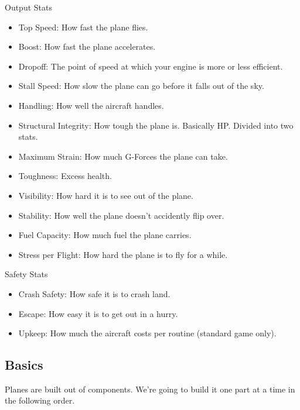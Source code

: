 \documentclass{article}
\begin{document}
Output Stats

\begin{itemize}
  \item          Top Speed: How fast the plane flies.
  \item          Boost: How fast the plane accelerates.
  \item          Dropoff: The point of speed at which your engine is more or
        less efficient.
  \item          Stall Speed: How slow the plane can go before it falls out of
        the sky.
  \item          Handling: How well the aircraft handles.
  \item          Structural Integrity: How tough the plane is. Basically HP.
        Divided into two stats.
  \item          Maximum Strain: How much G-Forces the plane can take.
  \item          Toughness: Excess health.
  \item          Visibility: How hard it is to see out of the plane.
  \item          Stability: How well the plane doesn't accidently flip over.
  \item          Fuel Capacity: How much fuel the plane carries.
  \item          Stress per Flight: How hard the plane is to fly for a while.
\end{itemize}

Safety Stats

\begin{itemize}
  \item          Crash Safety: How safe it is to crash land.
  \item          Escape: How easy it is to get out in a hurry.
  \item          Upkeep: How much the aircraft costs per routine (standard game
        only).
\end{itemize}

\subsection{Basics}
\label{_Basics}

Planes are built out of components. We're going to build it one part at
a time in the following order.
\end{document}
